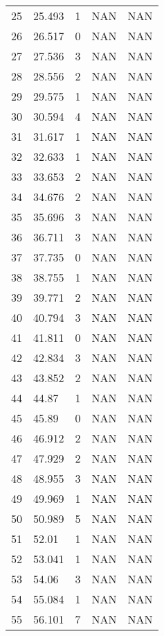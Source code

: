 \documentclass{article}
\begin{document}
\begin{longtable}{@{}lllll@{}}
				25  & 25.493  & 1     & NAN   & NAN   \\
				26  & 26.517  & 0     & NAN   & NAN   \\
				27  & 27.536  & 3     & NAN   & NAN   \\
				28  & 28.556  & 2     & NAN   & NAN   \\
				29  & 29.575  & 1     & NAN   & NAN   \\
				30  & 30.594  & 4     & NAN   & NAN   \\
				31  & 31.617  & 1     & NAN   & NAN   \\
				32  & 32.633  & 1     & NAN   & NAN   \\
				33  & 33.653  & 2     & NAN   & NAN   \\
				34  & 34.676  & 2     & NAN   & NAN   \\
				35  & 35.696  & 3     & NAN   & NAN   \\
				36  & 36.711  & 3     & NAN   & NAN   \\
				37  & 37.735  & 0     & NAN   & NAN   \\
				38  & 38.755  & 1     & NAN   & NAN   \\
				39  & 39.771  & 2     & NAN   & NAN   \\
				40  & 40.794  & 3     & NAN   & NAN   \\
				41  & 41.811  & 0     & NAN   & NAN   \\
				42  & 42.834  & 3     & NAN   & NAN   \\
				43  & 43.852  & 2     & NAN   & NAN   \\
				44  & 44.87   & 1     & NAN   & NAN   \\
				45  & 45.89   & 0     & NAN   & NAN   \\
				46  & 46.912  & 2     & NAN   & NAN   \\
				47  & 47.929  & 2     & NAN   & NAN   \\
				48  & 48.955  & 3     & NAN   & NAN   \\
				49  & 49.969  & 1     & NAN   & NAN   \\
				50  & 50.989  & 5     & NAN   & NAN   \\
				51  & 52.01   & 1     & NAN   & NAN   \\
				52  & 53.041  & 1     & NAN   & NAN   \\
				53  & 54.06   & 3     & NAN   & NAN   \\
				54  & 55.084  & 1     & NAN   & NAN   \\
				55  & 56.101  & 7     & NAN   & NAN   \\

\end{longtable}
\end{document}
